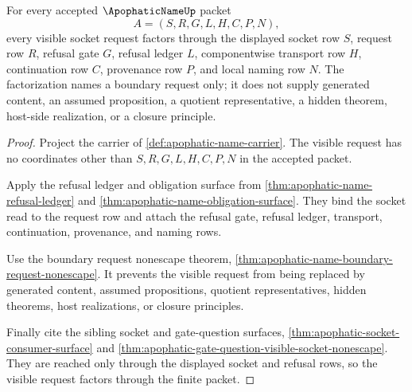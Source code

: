 \begin{theorem}
\label{thm:apophatic-name-visible-request-factorization}
For every accepted $\ApophaticNameUp$ packet
$$
A=(S,R,G,L,H,C,P,N),
$$
every visible socket request factors through the displayed socket row $S$, request row $R$, refusal gate $G$, refusal ledger $L$, componentwise transport row $H$, continuation row $C$, provenance row $P$, and local naming row $N$. The factorization names a boundary request only; it does not supply generated content, an assumed proposition, a quotient representative, a hidden theorem, host-side realization, or a closure principle.
\end{theorem}
\begin{proof}
Project the carrier of \autoref{def:apophatic-name-carrier}. The visible request has no coordinates other than $S,R,G,L,H,C,P,N$ in the accepted packet.

Apply the refusal ledger and obligation surface from \autoref{thm:apophatic-name-refusal-ledger} and \autoref{thm:apophatic-name-obligation-surface}. They bind the socket read to the request row and attach the refusal gate, refusal ledger, transport, continuation, provenance, and naming rows.

Use the boundary request nonescape theorem, \autoref{thm:apophatic-name-boundary-request-nonescape}. It prevents the visible request from being replaced by generated content, assumed propositions, quotient representatives, hidden theorems, host realizations, or closure principles.

Finally cite the sibling socket and gate-question surfaces, \autoref{thm:apophatic-socket-consumer-surface} and \autoref{thm:apophatic-gate-question-visible-socket-nonescape}. They are reached only through the displayed socket and refusal rows, so the visible request factors through the finite packet.
\end{proof}

